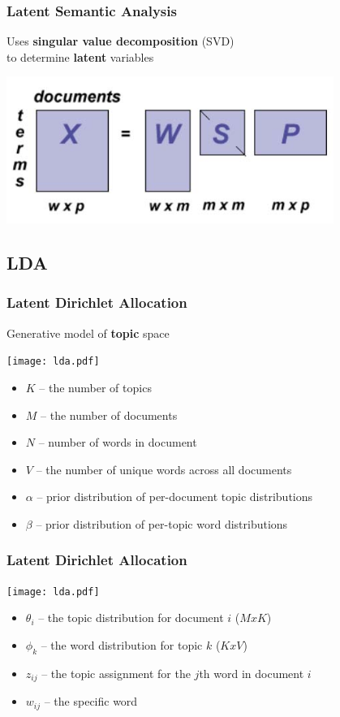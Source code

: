 \documentclass[t]{beamer}
\begin{document}
\begin{frame}
\frametitle{Latent Semantic Analysis}
Uses \textbf{singular value decomposition} (SVD) \\
to determine \textbf{latent} variables

\includegraphics[width=0.8\textwidth]{img/lsa.jpg}

\cite{deerwester1990,dumais2005}
\end{frame}

\subsection{LDA}
\begin{frame}
\frametitle{Latent Dirichlet Allocation}
Generative model of \textbf{topic} space

%
\texttt{[image: lda.pdf]}

\begin{itemize}
\item $K$ -- the number of topics
\item $M$ -- the number of documents
\item $N$ -- number of words in document
\item $V$ -- the number of unique words across all documents
\item $\alpha$ -- prior distribution of per-document topic distributions
\item $\beta$ -- prior distribution of per-topic word distributions
\end{itemize}

\cite{Blei2003}
\end{frame}

\begin{frame}
\frametitle{Latent Dirichlet Allocation}

%
\texttt{[image: lda.pdf]}

\begin{itemize}
\item $\theta_i$ -- the topic distribution for document $i$ ($MxK$)
\item $\phi_k$ -- the word distribution for topic $k$ ($KxV$)
\item $z_{ij}$ -- the topic assignment for the $j$th word in document $i$
\item $w_{ij}$ -- the specific word
\end{itemize}

\cite{Blei2003}
\end{frame}
\end{document}
